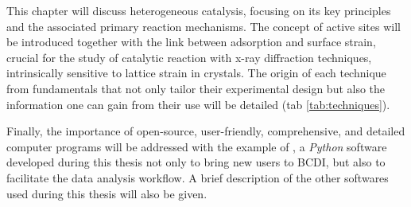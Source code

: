 This chapter will discuss heterogeneous catalysis, focusing on its key principles and the associated primary reaction mechanisms.
The concept of active sites will be introduced together with the link between adsorption and surface strain, crucial for the study of catalytic reaction with x-ray diffraction techniques, intrinsically sensitive to lattice strain in crystals.
The origin of each technique from fundamentals that not only tailor their experimental design but also the information one can gain from their use will be detailed (tab \ref{tab:techniques}).

Finally, the importance of open-source, user-friendly, comprehensive, and detailed computer programs will be addressed with the example of , a \textit{Python} software developed during this thesis not only to bring new users to BCDI, but also to facilitate the data analysis workflow.
A brief description of the other softwares used during this thesis will also be given.